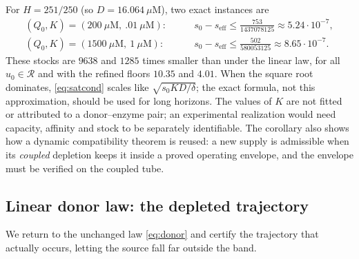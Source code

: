 \documentclass[11pt,a4paper]{article}
\theoremstyle{plain}
\theoremstyle{definition}
\theoremstyle{remark}
\newcommand{\uM}{\ensuremath{\mu\mathrm{M}}}
\newcommand{\RR}{\mathcal R}
\begin{document}
For $H=251/250$ (so $D=16.064~\uM$), two exact instances are
\begin{align*}
(Q_0,K)=(200~\uM,\ .01~\uM):&\qquad s_0-s_{\mathrm{eff}}\le\tfrac{753}{1437078125}\approx5.24\cdot10^{-7},\\
(Q_0,K)=(1500~\uM,\ 1~\uM):&\qquad s_0-s_{\mathrm{eff}}\le\tfrac{502}{580053125}\approx8.65\cdot10^{-7}.
\end{align*}
These stocks are $9638$ and $1285$ times smaller than under the linear law, for
all $u_0\in\RR$ and with the refined floors $10.35$ and $4.01$. When the square
root dominates, \eqref{eq:satcond} scales like $\sqrt{s_0KD/\delta}$; the exact
formula, not this approximation, should be used for long horizons. The values
of $K$ are not fitted or attributed to a donor--enzyme pair; an experimental
realization would need capacity, affinity and stock to be separately
identifiable. The corollary also shows how a dynamic compatibility theorem is
reused: a new supply is admissible when its \emph{coupled} depletion keeps it
inside a proved operating envelope, and the envelope must be verified on the
coupled tube.

\subsection{Linear donor law: the depleted trajectory}\label{sec:tube-result}
We return to the unchanged law \eqref{eq:donor} and certify the trajectory that
actually occurs, letting the source fall far outside the band.
\end{document}
